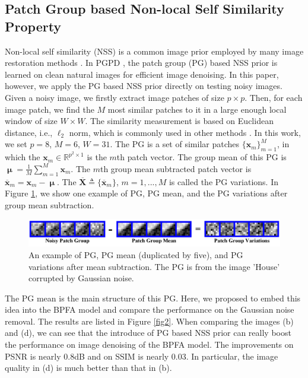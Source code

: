 \documentclass[runningheads]{llncs}
\begin{document}
\subsection{Patch Group based Non-local Self Similarity Property}
Non-local self similarity (NSS) is a common image prior employed by many image restoration methods \cite{nlm,bm3d,lssc,ncsr,wnnm,pgpd}. In PGPD \cite{pgpd}, the patch group (PG) based NSS prior is learned on clean natural images for efficient image denoising. In this paper, however, we apply the PG based NSS prior directly on testing noisy images. Given a noisy image, we firstly extract image patches of size $p\times p$. Then, for each image patch, we find the $M$ most similar patches to it in a large enough local window of size $W\times W$. The similarity measurement is based on Euclidean distance, i.e., $\ell_{2}$ norm, which is commonly used in other methods \cite{bm3d,lssc,ncsr,wnnm,pgpd}. In this work, we set $p=8$, $M=6$, $W=31$. The PG is a set of similar patches $\{\mathbf{x}_{m}\}_{m=1}^{M}$, in which the $\mathbf{x}_{m}\in \mathbb{R}^{p^{2}\times1}$ is the $m$th patch vector. The group mean of this PG is $\boldsymbol{\upmu}=\frac{1}{M}\sum_{m=1}^{M}\mathbf{x}_{m}$. The $m$th group mean subtracted patch vector is $\mathbf{\overline{x}}_{m}=\mathbf{x}_{m}-\boldsymbol{\upmu}$. The $\mathbf{\overline{X}}\triangleq \{\mathbf{\overline{x}}_{m}\}$, $m=1,...,M$ is called the PG variations. In Figure \ref{fig1}, we show one example of PG, PG mean, and the PG variations after group mean subtraction.
\begin{figure}
\centering
\includegraphics[width=1\textwidth]{PGResiduals2.png}
\vspace{-0.3in}
\caption{An example of PG, PG mean (duplicated by five), and PG variations after mean subtraction. The PG is from the image 'House' corrupted by Gaussian noise.}
\label{fig1}\vspace{-0.1in}
\end{figure}
The PG mean is the main structure of this PG. Here, we proposed to embed this idea into the BPFA model \cite{bpfa} and compare the performance on the Gaussian noise removal. The results are listed in Figure \ref{fig2}. When comparing the images (b) and (d), we can see that the introduce of PG based NSS prior can really boost the performance on image denoising of the BPFA model. The improvements on PSNR is nearly 0.8dB and on SSIM is nearly 0.03. In particular, the image quality in (d) is much better than that in (b). 
\end{document}
